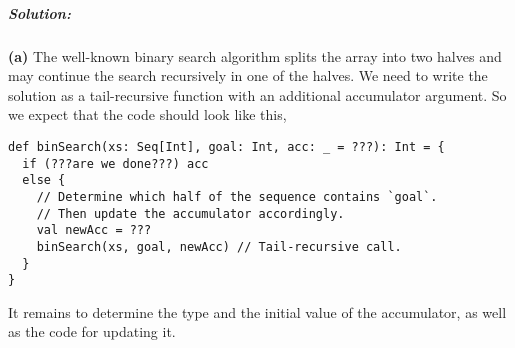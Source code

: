 \subparagraph{Solution:}

\textbf{(a)} The well-known binary search algorithm splits the array
into two halves and may continue the search recursively in one of
the halves. We need to write the solution as a tail-recursive function
with an additional accumulator argument. So we expect that the code
should look like this,
\begin{lstlisting}
def binSearch(xs: Seq[Int], goal: Int, acc: _ = ???): Int = {
  if (???are we done???) acc
  else {
    // Determine which half of the sequence contains `goal`.
    // Then update the accumulator accordingly.
    val newAcc = ???
    binSearch(xs, goal, newAcc) // Tail-recursive call.
  }
}
\end{lstlisting}
It remains to determine the type and the initial value of the accumulator,
as well as the code for updating it.

